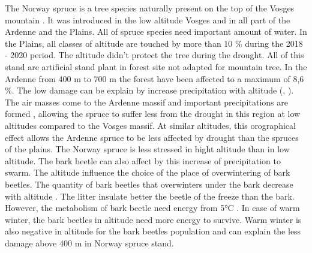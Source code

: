 \documentclass[3p,procedia]{elsarticle}
\begin{document}
The Norway spruce is a tree species naturally present on the top of the Vosges mountain \citep{guinier_trois_1959}. 
It was introduced in the low altitude Vosges and in  all part of the Ardenne and the Plains. 
All of spruce species need important amount of water. 
In the Plains, all classes of altitude are touched by more than 10 \% during the 2018 - 2020 period. 
The altitude didn't protect the tree during the drought. 
All of this stand are artificial stand plant in forest site not adapted for mountain tree. 
In the Ardenne from 400 m to 700 m the forest have been affected to a maximum of 8,6 \%. 
The low damage can be explain by increase precipitation with altitude (\cite{kotlarski_elevation_2012}, \cite{Roe_orographic_preicpitation_2005}).
The air masses come to the Ardenne massif and important precipitations are formed  \citep{van_der_perre_carte_2015}, allowing the spruce to suffer less from the drought in this region at low altitudes compared to the Vosges massif. 
At similar altitudes, this orographical effect allows the Ardenne spruce to be less affected by drought than the spruces of the plains.
The Norway spruce is less stressed in hight altitude than in low altitude. 
The bark beetle can also affect by this increase of precipitation to swarm. 
The altitude influence the choice of the place of overwintering of bark beetles.
The quantity of bark beetles that overwinters under the bark decrease with altitude \citep{kasumovic_overwintering_2019}.
The litter insulate better the beetle of the freeze \citep{lombardero_cold_2000} than the bark.
However, the metabolism of bark beetle need energy from 5°C  \citep{kostal_physiological_2011}.
In case of warm winter, the bark beetles in altitude need more energy to survive. 
Warm winter is also negative in altitude for the bark beetles population and can explain the less damage above 400 m in Norway spruce  stand.

\end{document}
